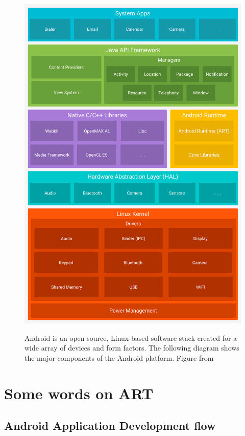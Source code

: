\begin{figure}[ht]
	\centering
	\includegraphics[width=\textwidth]{images/hello/android-stack.png}
	\label{fig:stack}
	\caption{Android is an open source, Linux-based software stack created for a wide array of devices and form factors. The following diagram shows the major components of the Android platform. Figure from \cite{google2017}}
\end{figure}

\section{Some words on ART}
\subsection{Android Application Development flow}

